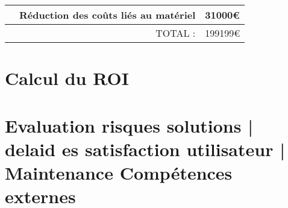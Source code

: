 \begin{tabular}{|p{7cm}|p{5cm}|p{2cm}|}
                                  & Réduction des coûts liés au matériel
                                                          &  31000€ \\ \hline  
\multicolumn{2}{|r|}{TOTAL :} & 199199€ \\ \hline                                                                                                                                                                                                                                                                                             
                                                                                                                                                                                                                                                                   
                                                                                                                                                                            
                                      


\end{tabular}
        
\section{Calcul du ROI}

\section{Evaluation risques solutions | delaid es satisfaction utilisateur | Maintenance Compétences externes}

